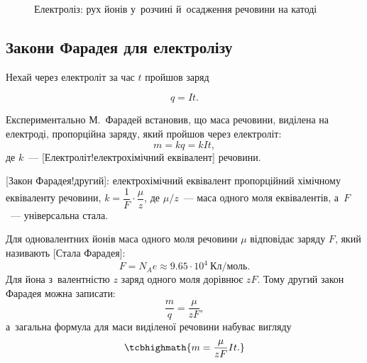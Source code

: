 \begin{figure}[h!]\centering
	\caption{Електроліз: рух йонів у~розчині й~осадження речовини на
	катоді\label{pic:ElectrolysisCell}}
\end{figure}


\subsection*{Закони Фарадея для електролізу}


Нехай через електроліт за час $t$ пройшов заряд

\begin{equation*}
	q=It.
\end{equation*}

Експериментально М.~Фарадей встановив, що маса речовини, виділена на електроді,
пропорційна заряду, який пройшов через електроліт:
\begin{equation}\label{eq:FaradayFirst}
	m=kq=kIt,
\end{equation}
де $k$~--- [Електроліт!електрохімічний еквівалент] речовини.

[Закон Фарадея!другий]: електрохімічний еквівалент пропорційний хімічному
еквіваленту речовини, $k=\dfrac1F\cdot\dfrac{\mu}{z}$, де $\mu/z$~--- маса одного моля
еквівалентів, а~$F$~--- універсальна стала.

Для одновалентних йонів маса одного моля речовини $\mu$ відповідає заряду $F$, який
називають [Стала Фарадея]:
\begin{equation}
	F=N_Ae\approx9.65\cdot10^4\ \text{Кл/моль}.
\end{equation}
Для йона з~валентністю $z$ заряд одного моля дорівнює $zF$. Тому другий закон Фарадея
можна записати:
\begin{equation}\label{eq:FaradaySecond}
	\frac{m}{q}=\frac{\mu}{zF},
\end{equation}
а~загальна формула для маси виділеної речовини набуває вигляду
\begin{equation}\label{eq:ElectrolysisMass}
	\tcbhighmath{
		m=\frac{\mu}{zF}It.
	}
\end{equation}

